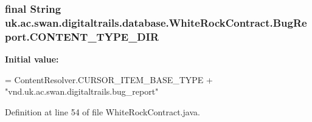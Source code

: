 \hypertarget{classuk_1_1ac_1_1swan_1_1digitaltrails_1_1database_1_1_white_rock_contract_1_1_bug_report_a341512426531ad69274608399249155d}{
\subsubsection[{C\+O\+N\+T\+E\+N\+T\+\_\+\+T\+Y\+P\+E\+\_\+\+D\+I\+R}]{\setlength{\rightskip}{0pt plus 5cm}final String uk.\+ac.\+swan.\+digitaltrails.\+database.\+White\+Rock\+Contract.\+Bug\+Report.\+C\+O\+N\+T\+E\+N\+T\+\_\+\+T\+Y\+P\+E\+\_\+\+D\+I\+R\hspace{0.3cm}{\ttfamily [static]}}}\label{classuk_1_1ac_1_1swan_1_1digitaltrails_1_1database_1_1_white_rock_contract_1_1_bug_report_a341512426531ad69274608399249155d}
{\bfseries Initial value\+:}
\begin{DoxyCode}
= ContentResolver.CURSOR\_ITEM\_BASE\_TYPE +
                \textcolor{stringliteral}{"vnd.uk.ac.swan.digitaltrails.bug\_report"}
\end{DoxyCode}


Definition at line 54 of file White\+Rock\+Contract.\+java.

